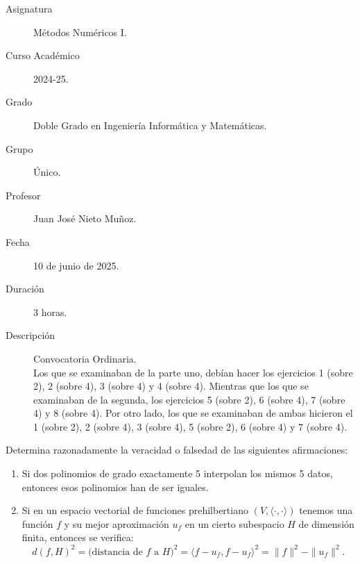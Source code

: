 \documentclass[12pt]{article}
\begin{document}
	
	
	
	
	
	\begin{description}
		\item[Asignatura] Métodos Numéricos I.
		\item[Curso Académico] 2024-25.
		\item[Grado] Doble Grado en Ingeniería Informática y Matemáticas.
		\item[Grupo] Único.
		\item[Profesor] Juan José Nieto Muñoz.
		\item[Fecha] 10 de junio de 2025.
		\item[Duración] 3 horas.
		\item[Descripción] Convocatoria Ordinaria.\\
		Los que se examinaban de la parte uno, debían hacer los ejercicios 1 (sobre 2), 2 (sobre 4), 3 (sobre 4) y 4 (sobre 4). Mientras que los que se examinaban de la segunda, los ejercicios 5 (sobre 2), 6 (sobre 4), 7 (sobre 4) y 8 (sobre 4). Por otro lado, los que se examinaban de ambas hicieron el  1 (sobre 2), 2 (sobre 4), 3 (sobre 4), 5 (sobre 2), 6 (sobre 4) y 7 (sobre 4).
	\end{description}
	\newpage
	
	\begin{ejercicio}
		Determina razonadamente la veracidad o falsedad de las siguientes afirmaciones:
		\begin{enumerate}[label=\alph*)]
			\item Si dos polinomios de grado exactamente 5 interpolan los mismos 5 datos, entonces esos polinomios han de ser iguales.
			
			\item Si en un espacio vectorial de funciones prehilbertiano $(V, \langle \cdot, \cdot \rangle)$ tenemos una función $f$ y su mejor aproximación $u_f$ en un cierto subespacio $H$ de dimensión finita, entonces se verifica:
			$$ d(f, H)^2 = \text{(distancia de } f \text{ a } H)^2 = \langle f - u_f, f - u_f \rangle^2 = \|f\|^2 - \|u_f\|^2.$$
		\end{enumerate}
	\end{ejercicio}
	
\end{document}

